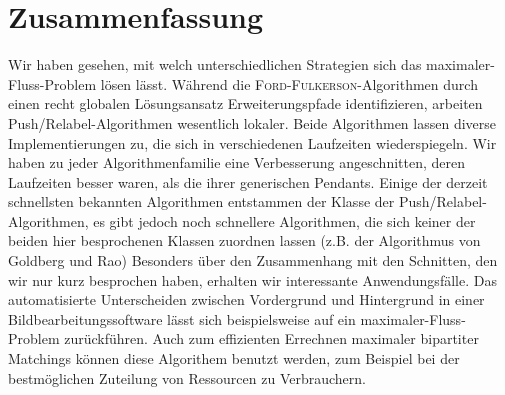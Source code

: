 \documentclass[12pt,a4paper,titlepage,onecolumn,ngerman,bibliography=totocnumbered]{scrartcl}
\theoremstyle{definition}
\theoremstyle{remark}
\newcommand{\ff}{\textsc{Ford-Fulkerson}}
\newcommand{\pr}{Push/Relabel}
\begin{document}
\section{Zusammenfassung}
Wir haben gesehen, mit welch unterschiedlichen Strategien sich das maximaler-Fluss-Problem lösen lässt.
Während die \ff -Algorithmen durch einen recht globalen Lösungsansatz Erweiterungspfade identifizieren, arbeiten \pr -Algorithmen wesentlich lokaler.
Beide Algorithmen lassen diverse Implementierungen zu, die sich in verschiedenen Laufzeiten wiederspiegeln.
Wir haben zu jeder Algorithmenfamilie eine Verbesserung angeschnitten, deren Laufzeiten besser waren, als die ihrer generischen Pendants.
Einige der derzeit schnellsten bekannten Algorithmen entstammen der Klasse der \pr -Algorithmen, es gibt jedoch noch schnellere Algorithmen, die sich keiner der beiden hier besprochenen Klassen zuordnen lassen (z.B. der Algorithmus von Goldberg und Rao)
\medbreak
Besonders über den Zusammenhang mit den Schnitten, den wir nur kurz besprochen haben, erhalten wir interessante Anwendungsfälle.
Das automatisierte Unterscheiden zwischen Vordergrund und Hintergrund in einer Bildbearbeitungssoftware lässt sich beispielsweise auf ein maximaler-Fluss-Problem zurückführen.
Auch zum effizienten Errechnen maximaler bipartiter Matchings können diese Algorithem benutzt werden, zum Beispiel bei der bestmöglichen Zuteilung von Ressourcen zu Verbrauchern.
\newpage
\printbibliography
\end{document}
